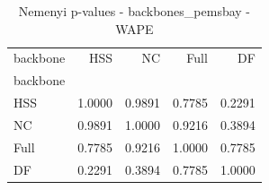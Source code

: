 \begin{table}
\caption{Nemenyi p-values - backbones_pemsbay - WAPE}
\label{tab:nemenyi_backbones_pemsbay_wape}
\begin{tabular}{lrrrr}
\toprule
backbone & HSS & NC & Full & DF \\
backbone &  &  &  &  \\
\midrule
HSS & 1.0000 & 0.9891 & 0.7785 & 0.2291 \\
NC & 0.9891 & 1.0000 & 0.9216 & 0.3894 \\
Full & 0.7785 & 0.9216 & 1.0000 & 0.7785 \\
DF & 0.2291 & 0.3894 & 0.7785 & 1.0000 \\
\bottomrule
\end{tabular}
\end{table}
